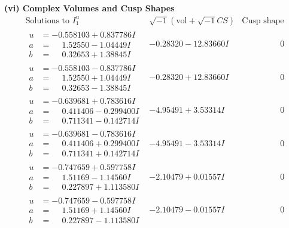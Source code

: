 \documentclass[1p]{elsarticle_modified}
\theoremstyle{definition}
\newcommand{\I}{\sqrt{-1}}
\begin{document}
\newpage\flushleft \textbf{(vi) Complex Volumes and Cusp Shapes}
$$\begin{array}{c|c|c}  
\text{Solutions to }I^u_{1}& \I (\text{vol} + \sqrt{-1}CS) & \text{Cusp shape}\\
 \hline 
\begin{aligned}
u &= -0.558103 + 0.837786 I \\
a &= \phantom{-}1.52550 - 1.04449 I \\
b &= \phantom{-}0.32653 + 1.38845 I\end{aligned}
 & -0.28320 - 12.83660 I & \phantom{-0.000000 } 0 \\ \hline\begin{aligned}
u &= -0.558103 - 0.837786 I \\
a &= \phantom{-}1.52550 + 1.04449 I \\
b &= \phantom{-}0.32653 - 1.38845 I\end{aligned}
 & -0.28320 + 12.83660 I & \phantom{-0.000000 } 0 \\ \hline\begin{aligned}
u &= -0.639681 + 0.783616 I \\
a &= \phantom{-}0.411406 - 0.299400 I \\
b &= \phantom{-}0.711341 - 0.142714 I\end{aligned}
 & -4.95491 + 3.53314 I & \phantom{-0.000000 } 0 \\ \hline\begin{aligned}
u &= -0.639681 - 0.783616 I \\
a &= \phantom{-}0.411406 + 0.299400 I \\
b &= \phantom{-}0.711341 + 0.142714 I\end{aligned}
 & -4.95491 - 3.53314 I & \phantom{-0.000000 } 0 \\ \hline\begin{aligned}
u &= -0.747659 + 0.597758 I \\
a &= \phantom{-}1.51169 - 1.14560 I \\
b &= \phantom{-}0.227897 + 1.113580 I\end{aligned}
 & -2.10479 + 0.01557 I & \phantom{-0.000000 } 0 \\ \hline\begin{aligned}
u &= -0.747659 - 0.597758 I \\
a &= \phantom{-}1.51169 + 1.14560 I \\
b &= \phantom{-}0.227897 - 1.113580 I\end{aligned}
 & -2.10479 - 0.01557 I & \phantom{-0.000000 } 0 \\ \hline\begin{aligned}

\end{aligned}
\end{array}$$
\end{document}
